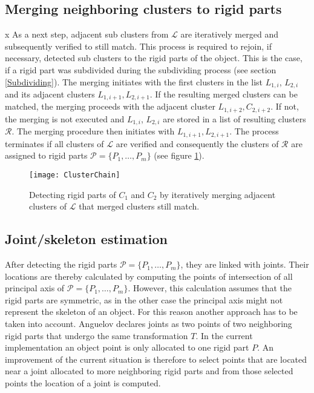 \subsection{Merging neighboring clusters to rigid parts}
\label{mergingClusters}x
As a next step, adjacent sub clusters from $\mathcal{L}$ are iteratively merged and subsequently verified to still match. This process is required to rejoin, if necessary, detected sub clusters to the rigid parts of the object. This is the case, if a rigid part was subdivided during the subdividing process (see section \ref{Subdividing}). The merging initiates with the first clusters in the list $L_{1,i}$, $L_{2,i}$ and its adjacent clusters $L_{1,i+1},L_{2,i+1}$. If the resulting merged clusters can be matched, the merging proceeds with the adjacent cluster $L_{1,i+2},C_{2,i+2}$. If not, the merging is not executed and $L_{1,i}$, $L_{2,i}$ are stored in a list of resulting clusters $\mathcal{R}$. The merging procedure then initiates with $L_{1,i+1},L_{2,i+1}$. The process terminates if all clusters of $\mathcal{L}$ are verified and consequently the clusters of $\mathcal{R}$ are assigned to rigid parts $\mathcal{P} =  \{P_1,\ldots,P_m\}$ (see figure \ref{fig:clusterChain}). 

\begin{figure}
	\centering
	\texttt{[image: ClusterChain]}
	\caption{Detecting rigid parts of $C_1$ and $C_2$ by iteratively merging adjacent clusters of $\mathcal{L}$ that merged clusters still match.}
	\label{fig:clusterChain}
\end{figure}

\subsection{Joint/skeleton estimation}

After detecting the rigid parts $\mathcal{P} =  \{ {P_1,\ldots,P_m}\}$, they are linked with joints. Their locations are thereby calculated by computing the points of intersection of all principal axis of $\mathcal{P} =  \{ {P_1,\ldots,P_m}\}$. However, this calculation assumes that the rigid parts are symmetric, as in the other case the principal axis might not represent the skeleton of an object. For this reason another approach has to be taken into account. Anguelov \cite{Anguelov04} declares joints as two points of two neighboring rigid parts that undergo the same transformation $T$. In the current implementation an object point is only allocated to one rigid part $P$. An improvement of the current situation is therefore to select points that are located near a joint allocated to more neighboring rigid parts and from those selected points the location of a joint is computed. 

